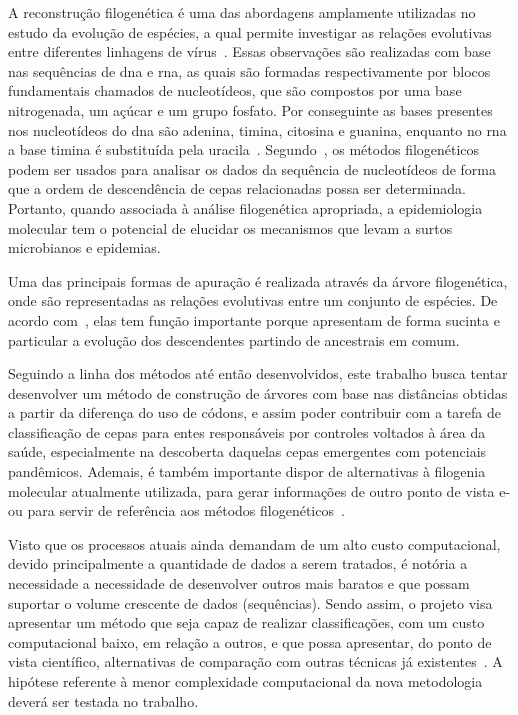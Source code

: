 A reconstrução filogenética é uma das abordagens amplamente utilizadas no estudo da evolução de espécies, a qual permite investigar as relações evolutivas entre diferentes linhagens de vírus~\cite{sistematica_santos_2012, consideracoes_ribas_2006,dinossauros_santos_2008}. Essas observações são realizadas com base nas sequências de \gls{dna} e \gls{rna}, as quais são formadas respectivamente por blocos fundamentais chamados de nucleotídeos, que são compostos por uma base nitrogenada, um açúcar e um grupo fosfato. Por conseguinte as bases presentes nos nucleotídeos do \gls{dna} são \gls{adenina}, \gls{timina}, \gls{citosina} e \gls{guanina}, enquanto no \gls{rna} a base \gls{timina} é substituída pela \gls{uracila}~\cite{alberts_molecular_2002,molecular_bernard_2022,genetica_peter_2017}.
Segundo~, os métodos filogenéticos podem ser usados para analisar os dados da sequência de nucleotídeos de forma que a ordem de descendência de cepas relacionadas possa ser determinada. Portanto, quando associada à análise filogenética apropriada, a epidemiologia molecular tem o potencial de elucidar os mecanismos que levam a surtos microbianos e epidemias.

Uma das principais formas de apuração é realizada através da árvore filogenética, onde são representadas as relações evolutivas entre um conjunto de espécies. De acordo com~, elas tem função importante porque apresentam de forma sucinta e particular a evolução dos descendentes partindo de ancestrais em comum.

Seguindo a linha dos métodos até então desenvolvidos, este trabalho busca tentar desenvolver um método de construção de árvores com base nas distâncias obtidas a partir da diferença do uso de códons, e assim poder contribuir com a tarefa de classificação de cepas para entes responsáveis por controles voltados à área da saúde, especialmente na descoberta daquelas cepas emergentes com potenciais pandêmicos. Ademais, é também importante dispor de alternativas à filogenia molecular atualmente utilizada, para gerar informações de outro ponto de vista e-ou para servir de referência aos métodos filogenéticos~\cite{virology_flint_2015}.

Visto que os processos atuais ainda demandam de um alto custo computacional, devido principalmente a quantidade de dados a serem tratados, é notória a necessidade a necessidade de desenvolver outros mais baratos e que possam suportar o volume crescente de dados (sequências).
Sendo assim, o projeto visa apresentar um método que seja capaz de realizar classificações, com um custo computacional baixo, em relação a outros, e que possa apresentar, do ponto de vista científico, alternativas de comparação com outras técnicas já existentes~\cite{frank_chemistry_2017,gene_brow_2020}. A hipótese referente à menor complexidade computacional da nova metodologia deverá ser testada no trabalho.

